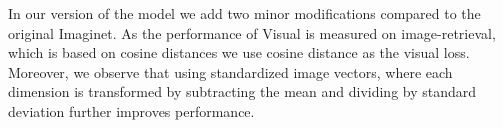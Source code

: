 In our version of the model we add two minor modifications 
compared to the original {\sc Imaginet}. As the performance of
{\sc Visual} is measured on image-retrieval, which is based on cosine 
distances we use cosine distance as the visual loss.
Moreover, we observe that using standardized image vectors, where each dimension 
is transformed by subtracting the mean and dividing by standard deviation further
improves performance.






